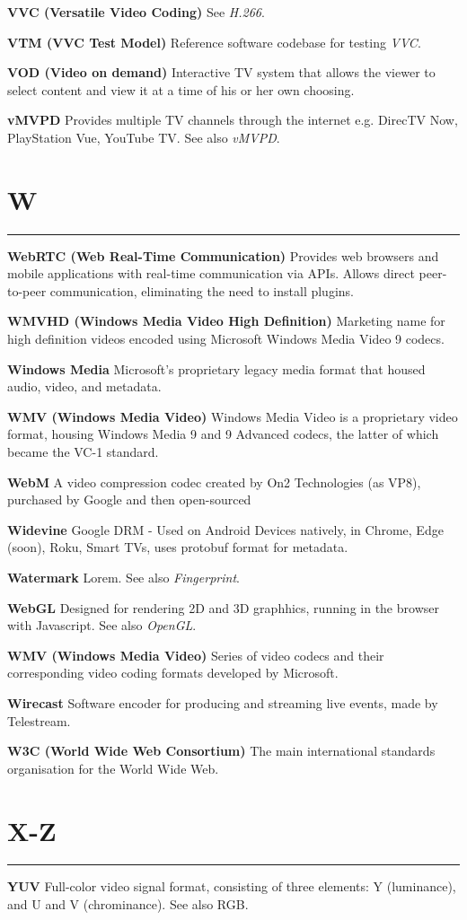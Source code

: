 \smallskip
\textbf{VVC (Versatile Video Coding)}
See \textit{H.266}.

\smallskip
\textbf{VTM (VVC Test Model)}
Reference software codebase for testing \textit{VVC}.

\smallskip
\textbf{VOD (Video on demand)}
Interactive TV system that allows the viewer to select content and view it at a time of his or her own choosing.

\smallskip
\textbf{vMVPD}
Provides multiple TV channels through the internet e.g. DirecTV Now, PlayStation Vue, YouTube TV. See also \textit{vMVPD}.

\section{W}
\hrule

\medskip
\textbf{WebRTC (Web Real-Time Communication)}
Provides web browsers and mobile applications with real-time communication via APIs. Allows direct peer-to-peer communication, eliminating the need to install plugins.

\smallskip
\textbf{WMVHD (Windows Media Video High Definition)}
Marketing name for high definition videos encoded using Microsoft Windows Media Video 9 codecs.

\smallskip
\textbf{Windows Media}
Microsoft's proprietary legacy media format that housed audio, video, and metadata.

\smallskip
\textbf{WMV (Windows Media Video)}
Windows Media Video is a proprietary video format, housing Windows Media 9 and 9 Advanced codecs, the latter of which became the VC-1 standard.

\smallskip
\textbf{WebM}
A video compression codec created by On2 Technologies (as VP8), purchased by Google and then open-sourced

\smallskip
\textbf{Widevine}
Google DRM - Used on Android Devices natively, in Chrome, Edge (soon), Roku, Smart TVs, uses protobuf format for metadata.

\smallskip
\textbf{Watermark}
Lorem. See also \textit{Fingerprint}.

\smallskip
\textbf{WebGL}
Designed for rendering 2D and 3D graphhics, running in the browser with Javascript. See also \textit{OpenGL}.

\smallskip
\textbf{WMV (Windows Media Video)}
Series of video codecs and their corresponding video coding formats developed by Microsoft.

\smallskip
\textbf{Wirecast}
Software encoder for producing and streaming live events, made by Telestream.

\smallskip
\textbf{W3C (World Wide Web Consortium)}
The main international standards organisation for the World Wide Web.

\section{X-Z}
\hrule

\medskip
\textbf{YUV}
Full-color video signal format, consisting of three elements: Y (luminance), and U and V (chrominance). See also RGB.
